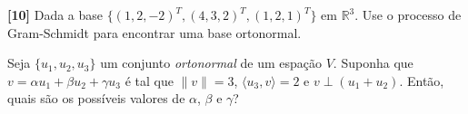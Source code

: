 \documentclass[11pt]{exam}
\begin{document}
\begin{questions}
  
  \question
  {\bf [10]} 
  Dada a base 
 $\{(1,2,-2)^{T},(4,3,2)^{T},(1,2,1)^{T}\}$ 
 em $\mathbb{R}^{3}$.
 Use o processo de Gram-Schmidt para encontrar uma base 
 ortonormal. 

  \question {\bf [10]} Seja $\{u_1,u_2, u_3\}$ um conjunto {\it ortonormal} de um espação $V$. %
  Suponha que $v= \alpha u_1+\beta u_2+\gamma u_3$ é tal que $\|v\|=3$, $\langle u_3, v \rangle=2$ 
  e $v \perp (u_1+u_2)$. Então, quais são os possíveis valores de $\alpha$, $\beta$ e $\gamma$? 
  \end{questions}
 
\end{document}
